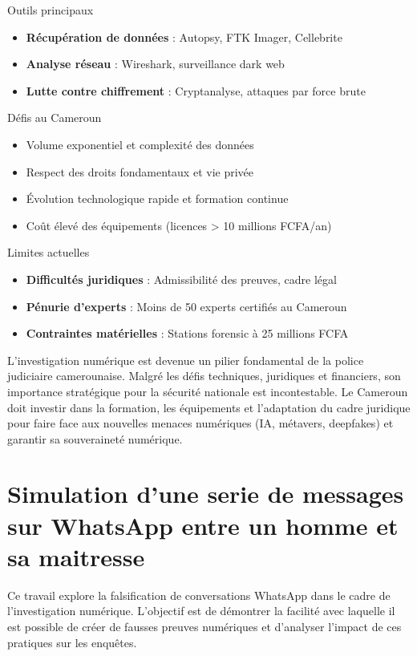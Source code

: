 \documentclass[12pt, a4em]{article}
\begin{document}
	Outils principaux
	\begin{itemize}
		\item \textbf{Récupération de données} : Autopsy, FTK Imager, Cellebrite
		\item \textbf{Analyse réseau} : Wireshark, surveillance dark web
		\item \textbf{Lutte contre chiffrement} : Cryptanalyse, attaques par force brute
	\end{itemize}
	
	Défis au Cameroun
	\begin{itemize}
		\item Volume exponentiel et complexité des données
		\item Respect des droits fondamentaux et vie privée
		\item Évolution technologique rapide et formation continue
		\item Coût élevé des équipements (licences > 10 millions FCFA/an)
	\end{itemize}
	
	Limites actuelles
	\begin{itemize}
		\item \textbf{Difficultés juridiques} : Admissibilité des preuves, cadre légal
		\item \textbf{Pénurie d'experts} : Moins de 50 experts certifiés au Cameroun
		\item \textbf{Contraintes matérielles} : Stations forensic à 25 millions FCFA
	\end{itemize}
	
	L'investigation numérique est devenue un pilier fondamental de la police judiciaire camerounaise. Malgré les défis techniques, juridiques et financiers, son importance stratégique pour la sécurité nationale est incontestable. Le Cameroun doit investir dans la formation, les équipements et l'adaptation du cadre juridique pour faire face aux nouvelles menaces numériques (IA, métavers, deepfakes) et garantir sa souveraineté numérique.
	
	
	\section{Simulation d'une serie de messages sur WhatsApp entre un homme et sa maitresse}
	
	Ce travail explore la falsification de conversations WhatsApp dans le cadre de l'investigation numérique. L'objectif est de démontrer la facilité avec laquelle il est possible de créer de fausses preuves numériques et d'analyser l'impact de ces pratiques sur les enquêtes.
	
\end{document}
